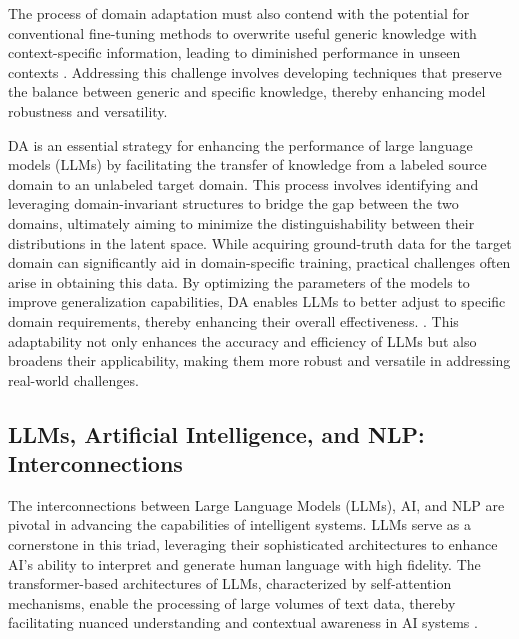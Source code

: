 The process of domain adaptation must also contend with the potential for conventional fine-tuning methods to overwrite useful generic knowledge with context-specific information, leading to diminished performance in unseen contexts \cite{kaur2024cropcontextwiserobuststatic}. Addressing this challenge involves developing techniques that preserve the balance between generic and specific knowledge, thereby enhancing model robustness and versatility.



DA is an essential strategy for enhancing the performance of large language models (LLMs) by facilitating the transfer of knowledge from a labeled source domain to an unlabeled target domain. This process involves identifying and leveraging domain-invariant structures to bridge the gap between the two domains, ultimately aiming to minimize the distinguishability between their distributions in the latent space. While acquiring ground-truth data for the target domain can significantly aid in domain-specific training, practical challenges often arise in obtaining this data. By optimizing the parameters of the models to improve generalization capabilities, DA enables LLMs to better adjust to specific domain requirements, thereby enhancing their overall effectiveness. \cite{park2023domainadaptationbasedhuman,zhao2017multiplesourcedomainadaptation}. This adaptability not only enhances the accuracy and efficiency of LLMs but also broadens their applicability, making them more robust and versatile in addressing real-world challenges.



\subsection{LLMs, Artificial Intelligence, and NLP: Interconnections} \label{subsec:LLMs, Artificial Intelligence, and NLP: Interconnections}



The interconnections between Large Language Models (LLMs), AI, and NLP are pivotal in advancing the capabilities of intelligent systems. LLMs serve as a cornerstone in this triad, leveraging their sophisticated architectures to enhance AI's ability to interpret and generate human language with high fidelity. The transformer-based architectures of LLMs, characterized by self-attention mechanisms, enable the processing of large volumes of text data, thereby facilitating nuanced understanding and contextual awareness in AI systems \cite{yamshchikov2020styletransferparaphraselookingsensible}.



